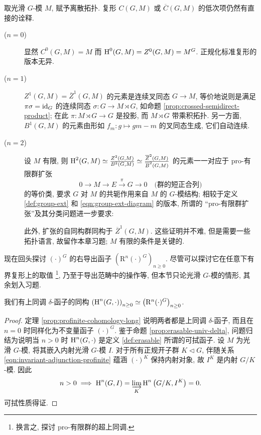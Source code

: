 取光滑 $G$-模 $M$, 赋予离散拓扑. 复形 $C(G, M)$ 或 $\overline{C}(G, M)$ 的低次项仍然有直接的诠释.
\begin{description}
	\item[($n=0$)] 显然 $C^0(G, M) = M$ 而 $\operatorname{H}^0(G, M) = Z^0(G, M) = M^G$. 正规化标准复形的版本无异.
	\item[($n=1$)] $Z^1(G, M) = \overline{Z}^1(G, M)$ 的元素是连续叉同态 $G \to M$, 等价地说则是满足 $\pi \sigma = \mathrm{id}_G$ 的连续同态 $\sigma: G \to M \rtimes G$, 如命题 \ref{prop:crossed-semidirect-product}; 在此 $\pi: M \rtimes G \to G$ 是投影, 而 $M \rtimes G$ 带乘积拓扑. 另一方面, $B^1(G, M)$ 的元素由形如 $f_m: g \mapsto gm - m$ 的叉同态生成, 它们自动连续.
	
	\item[($n=2$)] 设 $M$ 有限, 则 $\operatorname{H}^2(G, M) \simeq \frac{Z^2(G, M)}{B^2(G, M)} \simeq \frac{\overline{Z}^2(G, M)}{\overline{B}^2(G, M)}$ 的元素一一对应于 pro-有限群扩张
	\[ 0 \to M \to E \xrightarrow{\pi} G \to 0 \quad \text{(群的短正合列)} \]
	的等价类, 要求 $G$ 对 $M$ 的共轭作用来自 $M$ 的 $G$-模结构; 相较于定义 \ref{def:group-ext} 和 \eqref{eqn:group-ext-diagram} 的版本, 所谓的 ``pro-有限群扩张''及其分类问题进一步要求:

	此外, 扩张的自同构群同构于 $\overline{Z}^1(G, M)$. 这些证明并不难, 但是需要一些拓扑语言, 故留作本章习题; $M$ 有限的条件是关键的.
\end{description}

现在回头探讨 $(\cdot)^G$ 的右导出函子 $\left(\mathrm{R}^n (\cdot)^G\right)_{n \geq 0}$. 尽管可以探讨它在任意下有界复形上的取值 \footnote{换言之, 探讨 pro-有限群的超上同调.}, 乃至于导出范畴中的操作等, 但本节只论光滑 $G$-模的情形, 其余划入习题.

\begin{proposition}\label{prop:profinite-cohomology-identification}
	我们有上同调 $\delta$-函子的同构 $\left( \operatorname{H}^n(G, \cdot) \right)_{n \geq 0} \simeq \left(\mathrm{R}^n (\cdot)^G\right)_{n \geq 0}$.
\end{proposition}
\begin{proof}
	定理 \ref{prop:profinite-cohomology-long} 说明两者都是上同调 $\delta$-函子, 而且在 $n=0$ 时同样化为不变量函子 $(\cdot)^G$. 鉴于命题 \ref{prop:erasable-univ-delta}, 问题归结为说明当 $n > 0$ 时 $\operatorname{H}^n(G, \cdot)$ 是定义 \ref{def:erasable} 所谓的可拭函子. 设 $M$ 为光滑 $G$-模, 将其嵌入内射光滑 $G$-模 $I$. 对于所有正规开子群 $K \lhd G$, 伴随关系 \eqref{eqn:invariant-adjunction-profinite} 蕴涵 $(\cdot)^K$ 保持内射对象, 故 $I^K$ 是内射 $G/K$-模. 因此
	\[ n > 0 \implies \operatorname{H}^n(G, I) = \varinjlim_K \operatorname{H}^n\left( G/K, I^K\right) = 0. \]
	可拭性质得证.
\end{proof}

